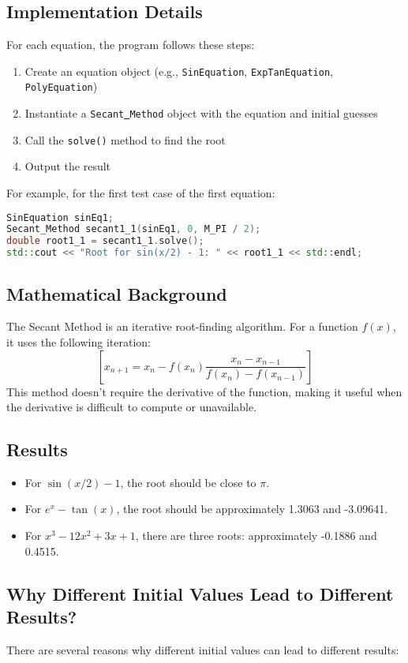 \documentclass{article}
\begin{document}
\subsection{Implementation Details}
For each equation, the program follows these steps:
\begin{enumerate}
\item Create an equation object (e.g., \texttt{SinEquation}, \texttt{ExpTanEquation}, \texttt{PolyEquation})
\item Instantiate a \texttt{Secant\underline{~}Method} object with the equation and initial guesses
\item Call the \texttt{solve()} method to find the root
\item Output the result
\end{enumerate}
For example, for the first test case of the first equation:
\begin{lstlisting}[language=C++]
SinEquation sinEq1;
Secant_Method secant1_1(sinEq1, 0, M_PI / 2);
double root1_1 = secant1_1.solve();
std::cout << "Root for sin(x/2) - 1: " << root1_1 << std::endl;
\end{lstlisting}
\subsection{Mathematical Background}
The Secant Method is an iterative root-finding algorithm. For a function $f(x)$, it uses the following iteration:
$$[ x_{n+1} = x_n - f(x_n) \frac{x_n - x_{n-1}}{f(x_n) - f(x_{n-1})} ]$$
This method doesn't require the derivative of the function, making it useful when the derivative is difficult to compute or unavailable.
\subsection{Results}
\begin{itemize}
\item For $\sin(x/2) - 1$, the root should be close to $\pi$.
\item For $e^x - \tan(x)$, the root should be approximately 1.3063 and -3.09641.
\item For $x^3 - 12x^2 + 3x + 1$, there are three roots: approximately -0.1886 and 0.4515.
\end{itemize}
\subsection{Why Different Initial Values Lead to Different Results?}
There are several reasons why different initial values can lead to different results:
\end{document}
